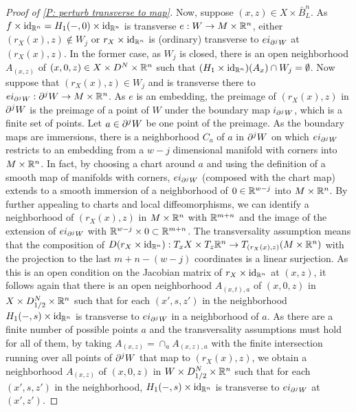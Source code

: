 \begin{proof}[Proof of \cref{P: perturb transverse to map}]
Now, suppose $(x,z)\in X\times \bar B^n_L$. As $f\times \mathrm{id}_{\mathbb{R}^n}=H_1(-,0)\times \mathrm{id}_{\mathbb{R}^n}$ is transverse $e:W\to M\times \mathbb{R}^n$, either $(r_X(x),z)\notin W_j$ or $r_X\times \mathrm{id}_{\mathbb{R}^n}$ is (ordinary) transverse to $ei_{\partial^jW}$ at $(r_X(x),z)$. In the former case, as $W_j$ is closed, there is an open neighborhood $A_{(x,z)}$ of $(x,0,z)\in X\times D^N\times \mathbb{R}^n$ such that $(H_1\times \mathrm{id}_{\mathbb{R}^n})(A_x)\cap W_j=\emptyset$. Now suppose that $(r_X(x),z)\in W_j$ and is transverse there to $ei_{\partial^jW}:\partial^jW\to M\times \mathbb{R}^n$. As $e$ is an embedding, the preimage of $(r_X(x),z)$ in $\partial^jW$ is the preimage of a point of $W$ under the boundary map $i_{\partial^jW}$, which is a finite set of points. Let $a\in \partial^jW$ be one point of the preimage. As the boundary maps are immersions, there is a neighborhood $C_a$ of $a$ in $\partial^jW$ on which $ei_{\partial^jW}$ restricts to an embedding from a $w-j$ dimensional manifold with corners into $M\times \mathbb{R}^n$. In fact, by choosing a chart around $a$ and using the definition of a smooth map of manifolds with corners, $ei_{\partial^jW}$ (composed with the chart map) extends to a smooth immersion of a neighborhood of $0\in \mathbb{R}^{w-j}$ into $M\times \mathbb{R}^n$.
 By further appealing to charts and local diffeomorphisms, we can identify a neighborhood of $(r_X(x),z)$ in $M\times \mathbb{R}^n$ with $\mathbb{R}^{m+n}$ and the image of the extension of $ei_{\partial^jW}$  with $\mathbb{R}^{w-j}\times 0\subset \mathbb{R}^{m+n}$. 
 The transversality assumption means that the composition of $D(r_X\times \mathrm{id}_{\mathbb{R}^n}):T_xX\times T_z\mathbb{R}^n 
\to T_{(r_X(x),z)}(M\times \mathbb{R}^n)$ with the projection to the last $m+n-(w-j)$ coordinates is a linear surjection. As this is an open condition on the Jacobian matrix of $r_X\times \mathrm{id}_{\mathbb{R}^n}$ at $(x,z)$, it follows again that there is an open neighborhood $A_{(x,t),a}$ of $(x,0,z)$ in $X\times D_{1/2}^N\times \mathbb{R}^n$ such that for each $(x',s,z')$ in the neighborhood $H_1(-,s)\times \mathrm{id}_{\mathbb{R}^n}$ is transverse to $ei_{\partial^jW}$ in a neighborhood of $a$. As there are a finite number of possible points $a$ and the transversality assumptions must hold for all of them, by taking $A_{(x,z)}=\cap_a A_{(x,z),a}$ with the finite intersection running over all points of $\partial^jW$ that map to $(r_X(x),z)$, we obtain a neighborhood $A_{(x,z)}$ of $(x,0,z)$ in $W\times D_{1/2}^N\times \mathbb{R}^n$ such that for each $(x',s,z')$ in the neighborhood, $H_1(-,s)\times \mathrm{id}_{\mathbb{R}^n}$ is transverse to $ei_{\partial^jW}$ at $(x',z')$.  


\end{proof}

